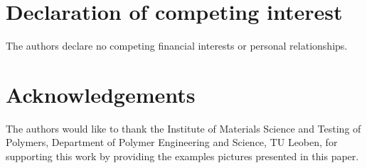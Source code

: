 \documentclass[final,5p,times]{elsarticle}
\begin{document}
		
	
	
	
	
	\section*{Declaration of competing interest}
	The authors declare no competing financial interests or personal relationships.
	
	
	\section*{Acknowledgements}
	The authors would like to thank the Institute of Materials Science and Testing of Polymers, Department of Polymer Engineering and Science, TU Leoben, for supporting this work by providing the examples pictures presented in this paper.
	
	
	
	
	
	
	
	
\end{document}
